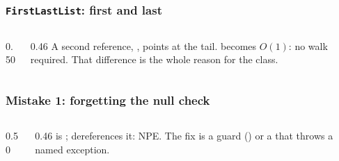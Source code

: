 \documentclass[aspectratio=169,10pt,compress]{beamer}
\begin{document}




\begin{frame}[t,fragile] \frametitle{\texttt{FirstLastList}: first and last}
  \begin{columns}[T]
    \begin{column}{0.50\textwidth}
    \end{column}
    \begin{column}{0.46\textwidth}
      \small
      A second reference, , points at the tail.
       becomes $O(1)$: no walk required. That difference
      is the whole reason for the class.
    \end{column}
  \end{columns}
\end{frame}





\begin{frame}[t,fragile] \frametitle{Mistake 1: forgetting the null check}
  \begin{columns}[T]
    \begin{column}{0.50\textwidth}
    \end{column}
    \begin{column}{0.46\textwidth}
      \small
       is ;  dereferences it: NPE.
      The fix is a guard () or a 
      that throws a named exception.
    \end{column}
  \end{columns}
\end{frame}
\end{document}
